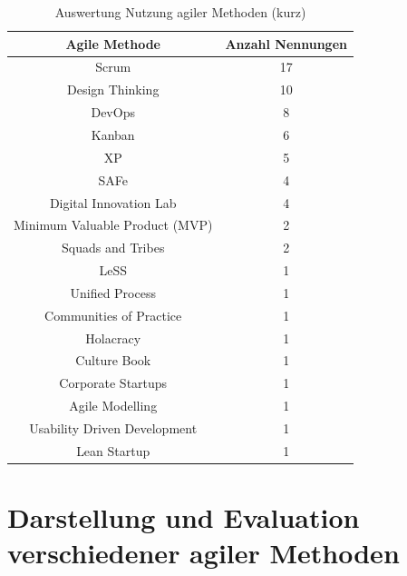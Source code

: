 \begin{table}[ht]
	\centering
	\caption{Auswertung Nutzung agiler Methoden (kurz)}
	\begin{tabular}{|c|c|}
		\hline
		\textbf{Agile Methode}& \textbf{Anzahl Nennungen} \\
		\hline
		Scrum                          & 17               \\
		Design Thinking                & 10               \\
		DevOps                         & 8                \\
		Kanban                         & 6                \\
		XP                             & 5                \\
		SAFe                           & 4                \\
		Digital Innovation Lab         & 4                \\
		Minimum Valuable Product (MVP) & 2                \\
		Squads and Tribes              & 2                \\
		LeSS                           & 1                \\
		Unified Process                & 1                \\
		Communities of Practice        & 1                \\
		Holacracy                      & 1                \\
		Culture Book                   & 1                \\
		Corporate Startups             & 1                \\
		Agile Modelling                & 1                \\
		Usability Driven Development   & 1                \\
		Lean Startup                   & 1               \\
		\hline
	\end{tabular}
	\label{tab:clusteringagileshort}
\end{table}

\todots

\section{Darstellung und Evaluation verschiedener agiler Methoden}


